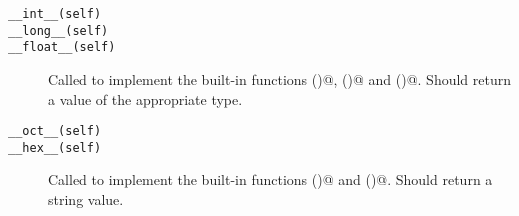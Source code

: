 \begin{description}
\item[\tt __int__(self)]\itemjoin
\item[\tt __long__(self)]\itemjoin
\item[\tt __float__(self)]\itembreak
Called to implement the built-in functions \verb@int()@, \verb@long()@
and \verb@float()@.  Should return a value of the appropriate type.

\item[\tt __oct__(self)]\itemjoin
\item[\tt __hex__(self)]\itembreak
Called to implement the built-in functions \verb@oct()@ and
\verb@hex()@.  Should return a string value.

\end{description}
